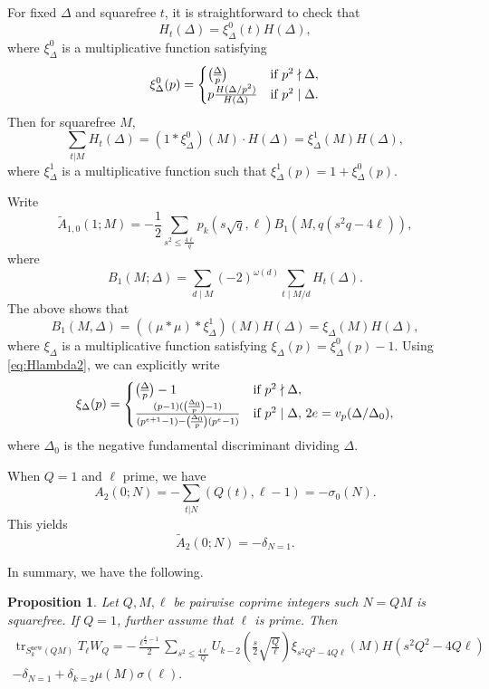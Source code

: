 \documentclass[11pt]{amsart}
\newcommand{\new}{\mathrm{new}}
\newcommand{\leg}{\overwithdelims ()}
\DeclareMathOperator{\tr}{tr}
\numberwithin{lem}{section}
\newtheorem{prop}[lem]{Proposition}
\theoremstyle{remark}
\theoremstyle{definition}
\numberwithin{equation}{section}
\begin{document}
For fixed $\Delta$ and squarefree $t$, it is straightforward to check that
\[ H_t(\Delta) = \xi^0_\Delta(t) H(\Delta), \]
where $\xi^0_\Delta$ is a multiplicative function satisfying
\[ \xi^0_\Delta(p) =
\begin{cases}
{\Delta \leg p} & \text{if }p^2 \nmid \Delta, \\
p \frac{H(\Delta/p^2)}{H(\Delta)} & \text{if }p^2 \mid \Delta.
\end{cases} \]
Then for squarefree $M$,
\[ \sum_{t | M} H_t(\Delta) = (1 * \xi_\Delta^0)(M) \cdot H(\Delta) =  \xi^1_\Delta(M) H(\Delta), \]
where $\xi^1_\Delta$ is a multiplicative function such that
$\xi^1_\Delta(p) = 1 + \xi^0_\Delta(p)$.

Write
\[ \tilde A_{1,0}(1; M) = - \frac 12 \sum_{s^2 \le \frac{4 \ell} q} p_k(s \sqrt q, \ell) B_1(M, q(s^2 q - 4 \ell)), \]
where \[ B_1(M; \Delta) = \sum_{d \mid M} (-2)^{\omega(d)} \sum_{t \mid M/d}
H_t (\Delta). \]
The above shows that
\[ B_1(M, \Delta) = ((\mu * \mu) * \xi^1_\Delta ) (M) H(\Delta) = \xi_\Delta(M) H(\Delta), \]
where $\xi_\Delta$ is a multiplicative function satisfying $\xi_\Delta(p) = \xi^0_\Delta(p) - 1$.  Using \eqref{eq:Hlambda2}, we can explicitly write
\begin{equation}
\xi_\Delta(p) = \begin{cases}
{\Delta \leg p} -1  & \text{if }p^2 \nmid \Delta, \\
\frac{(p-1)( {\Delta_0 \leg p} - 1)}{(p^{e+1} - 1) - {\Delta_0 \leg p}(p^{e} - 1)}  & \text{if }p^2 \mid \Delta, \, 2e = v_p(\Delta/\Delta_0),
\end{cases}
\end{equation}
where $\Delta_0$ is the negative fundamental discriminant dividing $\Delta$.

When $Q=1$ and $\ell$ prime, we have
\[ A_2(0;N) = - \sum_{t | N} (Q(t), \ell - 1) = - \sigma_0(N). \]
This yields
\[ \tilde A_2(0;N) = -\delta_{N=1}. \]

In summary, we have the following.

\begin{prop} \label{prop:Tl-large}
Let $Q, M, \ell$ be pairwise coprime integers such $N = QM$ is squarefree.  If $Q = 1$, further assume that $\ell$ is prime.  Then
\begin{multline*} \tr_{S_k^\new(QM)} T_\ell W_Q = 
- \frac {\ell^{\frac k2 - 1}}2 \sum_{s^2 \le \frac{4 \ell} Q}
U_{k-2} (\frac s2 \sqrt{\frac Q \ell}) 
\xi_{s^2 Q^2 - 4 Q \ell}(M) H(s^2 Q^2 - 4 Q \ell) \\
 - \delta_{N = 1} + \delta_{k=2}\mu(M) \sigma(\ell).
\end{multline*}
\end{prop}
\end{document}
